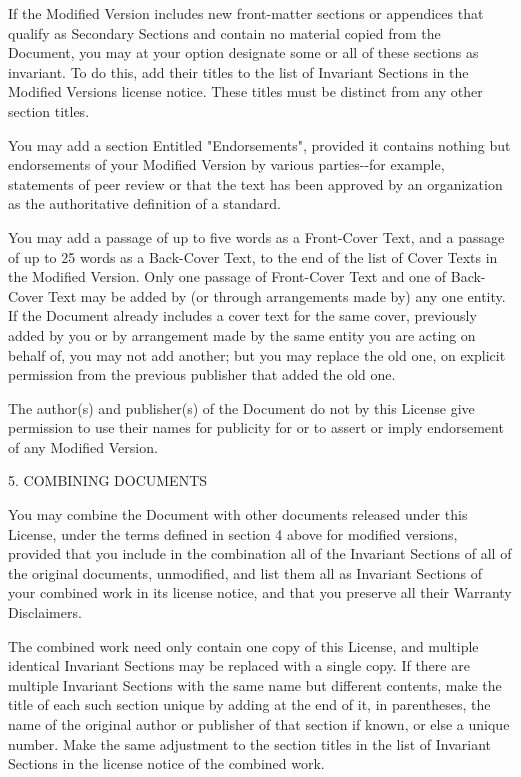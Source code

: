 \documentclass[
  english,
  11pt,
  a4paper,
]{article}
\begin{document}
If the Modified Version includes new front-matter sections or appendices
that qualify as Secondary Sections and contain no material copied from
the Document, you may at your option designate some or all of these
sections as invariant. To do this, add their titles to the list of
Invariant Sections in the Modified Version\textquotesingle s license
notice. These titles must be distinct from any other section titles.

You may add a section Entitled "Endorsements", provided it contains
nothing but endorsements of your Modified Version by various
parties-\/-for example, statements of peer review or that the text has
been approved by an organization as the authoritative definition of a
standard.

You may add a passage of up to five words as a Front-Cover Text, and a
passage of up to 25 words as a Back-Cover Text, to the end of the list
of Cover Texts in the Modified Version. Only one passage of Front-Cover
Text and one of Back-Cover Text may be added by (or through arrangements
made by) any one entity. If the Document already includes a cover text
for the same cover, previously added by you or by arrangement made by
the same entity you are acting on behalf of, you may not add another;
but you may replace the old one, on explicit permission from the
previous publisher that added the old one.

The author(s) and publisher(s) of the Document do not by this License
give permission to use their names for publicity for or to assert or
imply endorsement of any Modified Version.

5. COMBINING DOCUMENTS

You may combine the Document with other documents released under this
License, under the terms defined in section 4 above for modified
versions, provided that you include in the combination all of the
Invariant Sections of all of the original documents, unmodified, and
list them all as Invariant Sections of your combined work in its license
notice, and that you preserve all their Warranty Disclaimers.

The combined work need only contain one copy of this License, and
multiple identical Invariant Sections may be replaced with a single
copy. If there are multiple Invariant Sections with the same name but
different contents, make the title of each such section unique by adding
at the end of it, in parentheses, the name of the original author or
publisher of that section if known, or else a unique number. Make the
same adjustment to the section titles in the list of Invariant Sections
in the license notice of the combined work.
\end{document}
